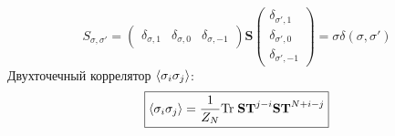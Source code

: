 \documentclass[12pt]{article}
\theoremstyle{definition}
\begin{document}
\begin{enumerate}
\begin{itemize}
\begin{equation}
    \end{equation}
    \begin{equation}
        S_{\sigma,\sigma'}=\begin{pmatrix}
        \delta_{\sigma,1} & \delta_{\sigma,0} & \delta_{\sigma,-1}
        \end{pmatrix}\textbf{S}\begin{pmatrix}
        \delta_{\sigma',1}\\\delta_{\sigma',0}\\\delta_{\sigma',-1}
        \end{pmatrix}=\sigma\delta(\sigma,\sigma')
    \end{equation}
    Двухточечный коррелятор $\braket{\sigma_i\sigma_j}$:
        \begin{equation}
            \boxed{\braket{\sigma_i\sigma_j}=\frac{1}{Z_N}\text{Tr}\;\textbf{S}\textbf{T}^{j-i}\textbf{S}\textbf{T}^{N+i-j}}
        \end{equation}
    \end{itemize}
\end{enumerate}
\end{document}
